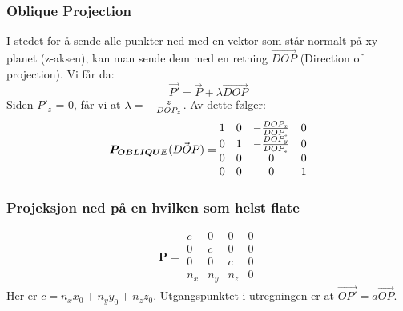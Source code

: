 \subsubsection{Oblique Projection}
I stedet for å sende alle punkter ned med en vektor som står normalt på xy-planet (z-aksen), kan man sende dem med en retning $\vec{DOP}$ (Direction of projection). Vi får da:
\begin{equation}
    \vec{P'} = \vec{P} + \lambda \vec{DOP}
\end{equation}
Siden $P'_z$ = 0, får vi at $ \lambda = - {z \over DOP_z} $.
Av dette følger:
\begin{equation}
    \boldsymbol{P_{OBLIQUE}}(\vec{DOP}) =
    \begin{matrix}
        1 & 0 & -{DOP_x \over DOP_z} & 0 \\
        0 & 1 & -{DOP_y \over DOP_z} & 0 \\
        0 & 0 & 0 & 0 \\
        0 & 0 & 0 & 1
    \end{matrix}
\end{equation}

\subsubsection{Projeksjon ned på en hvilken som helst flate}
\begin{equation}
    \boldsymbol{P}=
    \begin{matrix}
        c & 0 & 0 & 0 \\
        0 & c & 0 & 0 \\
        0 & 0 & c & 0 \\
        n_x & n_y & n_z & 0
    \end{matrix}
\end{equation}
Her er $c = n_x x_0 + n_y y_0 + n_z z_0$. Utgangspunktet i utregningen er at $\vec{OP'} = a\vec{OP}$.

